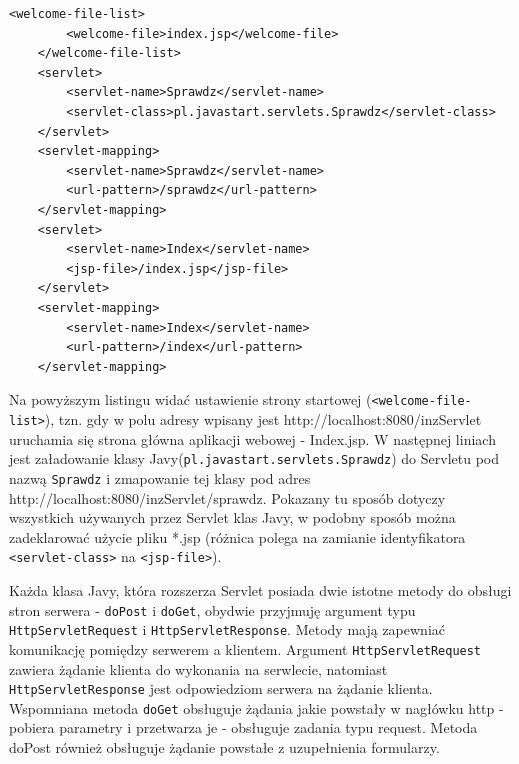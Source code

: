 \documentclass[eng,printmode,oneside]{mgr}
\begin{document}
\lstset{language=XML,firstnumber=1,stepnumber=1}
\begin{lstlisting}[caption=Fragment pliku web.xml,label=webxml]
	<welcome-file-list>
		<welcome-file>index.jsp</welcome-file>
	</welcome-file-list>
	<servlet>
		<servlet-name>Sprawdz</servlet-name>
		<servlet-class>pl.javastart.servlets.Sprawdz</servlet-class>
	</servlet>
	<servlet-mapping>
		<servlet-name>Sprawdz</servlet-name>
		<url-pattern>/sprawdz</url-pattern>
	</servlet-mapping>
	<servlet>
		<servlet-name>Index</servlet-name>
		<jsp-file>/index.jsp</jsp-file>
	</servlet>
	<servlet-mapping>
		<servlet-name>Index</servlet-name>
		<url-pattern>/index</url-pattern>
	</servlet-mapping>
\end{lstlisting}

Na powyższym listingu widać ustawienie strony startowej
(\texttt{<welcome-file-list>}), tzn. gdy w polu adresy wpisany jest
http://localhost:8080/inzServlet uruchamia się strona główna aplikacji webowej -
Index.jsp. W następnej liniach jest załadowanie klasy
Javy(\texttt{pl.javastart.servlets.Sprawdz}) do Servletu pod nazwą
\texttt{Sprawdz} i zmapowanie tej klasy pod adres
http://localhost:8080/inzServlet/sprawdz. Pokazany tu sposób dotyczy wszystkich
używanych przez Servlet klas Javy, w podobny sposób można zadeklarować użycie
pliku *.jsp (różnica polega na zamianie identyfikatora \texttt{<servlet-class>}
na \texttt{<jsp-file>}). 

Każda klasa Javy, która rozszerza Servlet posiada dwie istotne metody do obsługi
stron serwera - \texttt{doPost} i \texttt{doGet}, obydwie przyjmuję argument
typu \texttt{HttpServletRequest} i \texttt{HttpServletResponse}.
Metody mają zapewniać komunikację pomiędzy serwerem a klientem. Argument
\texttt{HttpServletRequest} zawiera żądanie klienta do wykonania na serwlecie,
natomiast \texttt{HttpServletResponse} jest odpowiedziom serwera na żądanie
klienta.
Wspomniana metoda \texttt{doGet} obsługuje żądania jakie powstały w nagłówku http - pobiera
parametry i przetwarza je - obsługuje zadania typu request. Metoda doPost
również obsługuje żądanie powstałe z uzupełnienia formularzy. 
\end{document}
